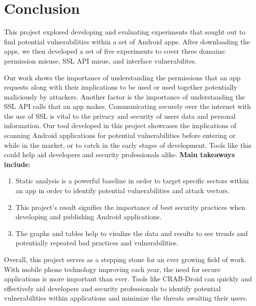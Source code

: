 \section{Conclusion}
\label{sec:conc}


This project explored developing and evaluating experiments that sought out to find potential vulnerabilities within a set of Android apps. 
After downloading the apps, we then developed a set of five experiments to cover three domains: permission misuse, SSL API misue, and interface vulnerabilites.

Our work shows the importance of understanding the permissions that an app requests along with their implications to be used or used together potentially maliciously by attackers. 
Another factor is the importance of understanding the SSL API calls that an app makes. Communicating securely over the internet with the use of SSL is vital to the privacy and security 
of users data and personal information. Our tool developed in this project showcases the implications of scanning Android applications for potential vulnerabilities before entering or while in the market, 
or to catch in the early stages of development. Tools like this could help aid developers and security professionals alike. 
\bigskip
\newline
\textbf{Main takeaways include}:
\begin{enumerate}
    \item Static analysis is a powerful baseline in order to target specific sectors within an app in order to identify potential vulnerabilities and attack vectors.
    \item This project's result signifies the importance of best security practices when developing and publishing Android applications.
    \item The graphs and tables help to visulize the data and results to see trends and potentially repeated bad practices and vulnerabilities. 
\end{enumerate}

Overall, this project serves as a stepping stone for an ever growing field of work. With mobile phone technology improving each year, the need for secure applications is more important than ever.
Tools like CRAB-Droid can quickly and effectively aid developers and security professionals to identify potential vulnerabilities within applications and minimize the threats awaiting their users.

